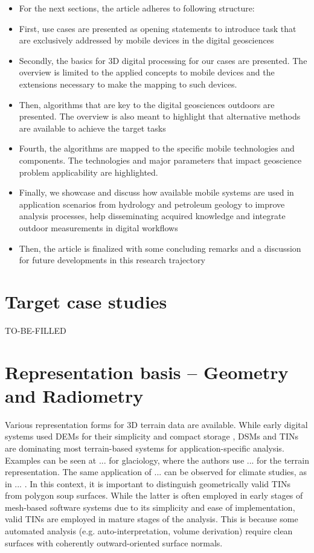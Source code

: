 \documentclass[review]{elsarticle}
\begin{document}
\begin{itemize}
\item For the next sections, the article adheres to following structure:
\item First, use cases are presented as opening statements to introduce task that are exclusively addressed by mobile devices in the digital geosciences
\item Secondly, the basics for 3D digital processing for our cases are presented. The overview is limited to the applied concepts to mobile devices and the extensions necessary to make the mapping to such devices.
\item Then, algorithms that are key to the digital geosciences outdoors are presented. The overview is also meant to highlight that alternative methods are available to achieve the target tasks
\item Fourth, the algorithms are mapped to the specific mobile technologies and components. The technologies and major parameters that impact geoscience problem applicability are highlighted.
\item Finally, we showcase and discuss how available mobile systems are used in application scenarios from hydrology and petroleum geology to improve analysis processes, help disseminating acquired knowledge and integrate outdoor measurements in digital workflows
\item Then, the article is finalized with some concluding remarks and a discussion for future developments in this research trajectory
\end{itemize}

\section{Target case studies}
\label{sec:case_studies}

TO-BE-FILLED

\section{Representation basis -- Geometry and Radiometry}
\label{sec:representations}

Various representation forms for 3D terrain data are available. While early digital systems used \glspl{DEM} for their simplicity and compact storage \cite{Trinks2004,McCaffrey2005,MANYMORE}, \glspl{DSM} and \glspl{TIN} are dominating most terrain-based systems for application-specific analysis. Examples can be seen at ... for glaciology, where the authors use ... for the terrain representation. The same application of ... can be observed for climate studies, as in ... . In this context, it is important to distinguish geometrically valid \glspl{TIN} from polygon soup surfaces. While the latter is often employed in early stages of mesh-based software systems due to its simplicity and ease of implementation, valid \glspl{TIN} are employed in mature stages of the analysis. This is because some automated analysis (e.g. auto-interpretation, volume derivation) require clean surfaces with coherently outward-oriented surface normals.
\end{document}

